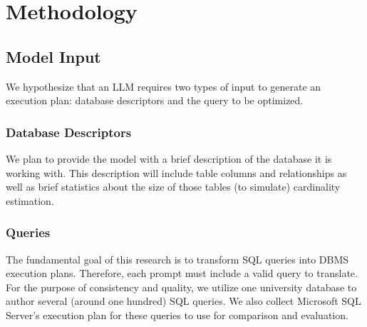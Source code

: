 \section{Methodology}
\subsection{Model Input}
We hypothesize that an LLM requires two types of input to generate an execution plan: database descriptors and the query to be optimized.

\subsubsection{Database Descriptors}
We plan to provide the model with a brief description of the database it is working with. This description will include table columns and relationships as well as brief statistics about the size of those tables (to simulate) cardinality estimation.

\subsubsection{Queries}
The fundamental goal of this research is to transform SQL queries into DBMS execution plans. Therefore, each prompt must include a valid query to translate. For the purpose of consistency and quality, we utilize one university database to author several (around one hundred) SQL queries. We also collect Microsoft SQL Server's execution plan for these queries to use for comparison and evaluation.

